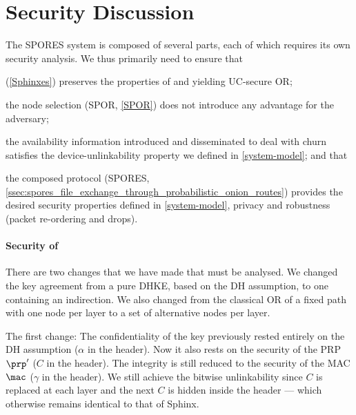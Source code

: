 \section{Security Discussion}%
\label{security-discussion}



The \ac{SPORES} system is composed of several parts, each of which requires its 
own security analysis.
We thus primarily need to ensure that
\begin{enumerate*}
\item \Sphinxes (\cref{Sphinxes}) preserves the properties of 
  \textcite{CLOnionRouting} and \textcite{Sphinx} yielding \ac{UC}-secure 
  \ac{OR};
\item the node selection (\ac{SPOR}, \cref{SPOR}) does not introduce any 
  advantage for the adversary;
\item the availability information introduced and disseminated to deal with 
  churn satisfies the device-unlinkability property we defined in 
  \cref{system-model}; and that
\item the composed protocol (\ac{SPORES}, \cref{ssec:spores_file_exchange_through_probabilistic_onion_routes}) provides the desired 
  security properties defined in \cref{system-model}, \ie
  privacy and robustness (packet re-ordering and drops).
\end{enumerate*}

\paragraph*{Security of \Sphinxes}

There are two changes that we have made that must be analysed.
We changed the key agreement from a pure \ac{DHKE}, \ie based on the \ac{DH} 
assumption, to one containing an indirection.
We also changed from the classical \ac{OR} of a fixed path with one node per 
layer to a set of alternative nodes per layer.

The first change:
The confidentiality of the key previously rested entirely on the \ac{DH} 
assumption (\(\alpha\) in the header).
Now it also rests on the security of the \ac{PRP} \(\prp'\) (\(C\) in the 
header).
The integrity is still reduced to the security of the \ac{MAC} \(\mac\) 
(\(\gamma\) in the header).
We still achieve the bitwise unlinkability since \(C\) is replaced at each 
layer and the next \(C\) is hidden inside the header --- which otherwise 
remains identical to that of Sphinx.

